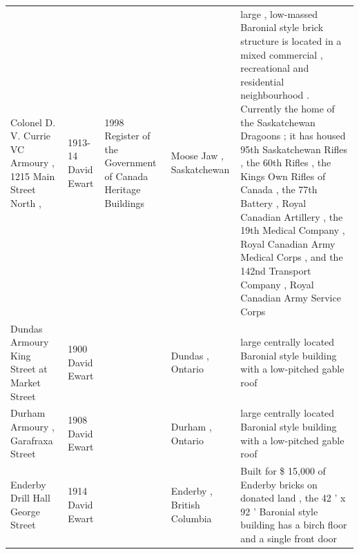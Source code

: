 \documentclass{article}
\begin{document}
\begin{tabular}{lllll}
Colonel D. V. Currie VC Armoury , 1215 Main Street North , & 1913-14 David Ewart & 1998 Register of the Government of Canada Heritage Buildings & Moose Jaw , Saskatchewan & large , low-massed Baronial style brick structure is located in a mixed commercial , recreational and residential neighbourhood . Currently the home of the Saskatchewan Dragoons ; it has housed 95th Saskatchewan Rifles , the 60th Rifles , the Kings Own Rifles of Canada , the 77th Battery , Royal Canadian Artillery , the 19th Medical Company , Royal Canadian Army Medical Corps , and the 142nd Transport Company , Royal Canadian Army Service Corps \\
Dundas Armoury King Street at Market Street & 1900 David Ewart &  & Dundas , Ontario & large centrally located Baronial style building with a low-pitched gable roof \\
Durham Armoury , Garafraxa Street & 1908 David Ewart &  & Durham , Ontario & large centrally located Baronial style building with a low-pitched gable roof \\
Enderby Drill Hall George Street & 1914 David Ewart &  & Enderby , British Columbia & Built for \$ 15,000 of Enderby bricks on donated land , the 42 ' x 92 ' Baronial style building has a birch floor and a single front door \\
\bottomrule
\end{tabular}
\end{document}
